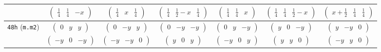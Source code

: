 \documentclass[fleqn,9pt,landscape]{jsarticle}
\begin{document}
\begin{center}
\begin{longtable}{ccccccc}
& $ \begin{pmatrix} \frac{1}{4} & \frac{1}{4} & - x \end{pmatrix} $ & $ \begin{pmatrix} \frac{1}{4} & x & \frac{1}{4} \end{pmatrix} $ & $ \begin{pmatrix} \frac{1}{4} & \frac{1}{2} - x & \frac{1}{4} \end{pmatrix} $ & $ \begin{pmatrix} \frac{1}{4} & \frac{1}{4} & x \end{pmatrix} $ & $ \begin{pmatrix} \frac{1}{4} & \frac{1}{4} & \frac{1}{2} - x \end{pmatrix} $ & $ \begin{pmatrix} x + \frac{1}{2} & \frac{1}{4} & \frac{1}{4} \end{pmatrix} $ \\ \hline
{\tt 48h} ({\tt m.m2}) & $ \begin{pmatrix} 0 & y & y \end{pmatrix} $ & $ \begin{pmatrix} 0 & - y & y \end{pmatrix} $ & $ \begin{pmatrix} 0 & - y & - y \end{pmatrix} $ & $ \begin{pmatrix} 0 & y & - y \end{pmatrix} $ & $ \begin{pmatrix} y & 0 & - y \end{pmatrix} $ & $ \begin{pmatrix} y & - y & 0 \end{pmatrix} $ \\
& $ \begin{pmatrix} - y & 0 & - y \end{pmatrix} $ & $ \begin{pmatrix} - y & - y & 0 \end{pmatrix} $ & $ \begin{pmatrix} y & 0 & y \end{pmatrix} $ & $ \begin{pmatrix} - y & 0 & y \end{pmatrix} $ & $ \begin{pmatrix} y & y & 0 \end{pmatrix} $ & $ \begin{pmatrix} - y & y & 0 \end{pmatrix} $ \\ \hline

\end{longtable}
\end{center}
\end{document}
